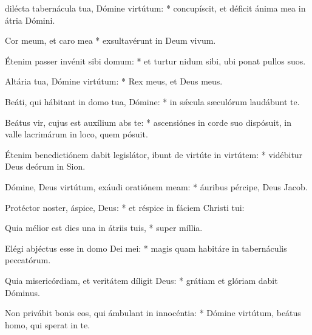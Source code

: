 \begin{psalmus}

     dilécta tabernácula tua, Dómine virtútum: * concupíscit, et déficit ánima mea in átria Dómini.

		Cor meum, et caro mea * exsultavérunt in Deum vivum.

		Étenim passer invénit sibi domum: * et turtur nidum sibi, ubi ponat pullos suos.

		Altária tua, Dómine virtútum: * Rex meus, et Deus meus.

		Beáti, qui hábitant in domo tua, Dómine: * in sǽcula sæculórum laudábunt te.

		Beátus vir, cujus est auxílium abs te: * ascensiónes in corde suo dispósuit, in valle lacrimárum in loco, quem pósuit.

		Étenim benedictiónem dabit legislátor, ibunt de virtúte in virtútem: * vidébitur Deus deórum in Sion.

		Dómine, Deus virtútum, exáudi oratiónem meam: * áuribus pércipe, Deus Jacob.

		Protéctor noster, áspice, Deus: * et réspice in fáciem Christi tui:

		Quia mélior est dies una in átriis tuis, * super míllia.

		Elégi abjéctus esse in domo Dei mei: * magis quam habitáre in tabernáculis peccatórum.

		Quia misericórdiam, et veritátem díligit Deus: * grátiam et glóriam dabit Dóminus.

		Non privábit bonis eos, qui ámbulant in innocéntia: * Dómine virtútum, beátus homo, qui sperat in te.

\end{psalmus}
